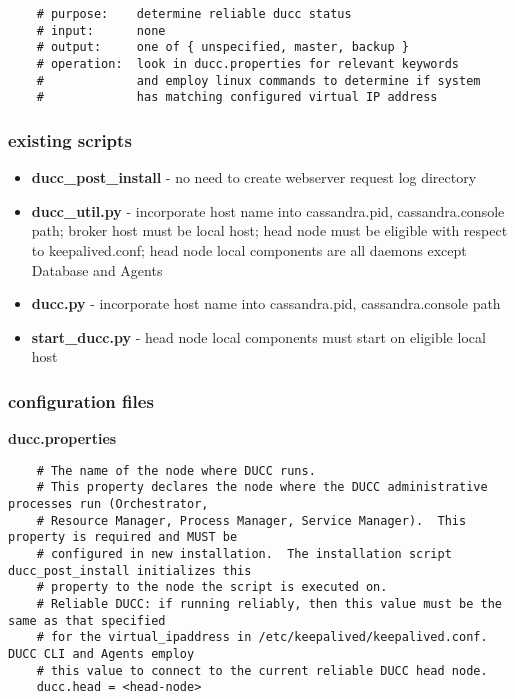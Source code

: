 \documentclass[letterpaper]{article}
\begin{document}
   \begin{verbatim}
    # purpose:    determine reliable ducc status
    # input:      none
    # output:     one of { unspecified, master, backup }
    # operation:  look in ducc.properties for relevant keywords
    #             and employ linux commands to determine if system
    #             has matching configured virtual IP address
   \end{verbatim}

\subsubsection{existing scripts}

{\renewcommand\labelitemi{}
\begin{itemize}
  \item \textbf{ducc\_post\_install} - no need to create webserver request log directory
  \item \textbf{ducc\_util.py} - incorporate host name into cassandra.pid, cassandra.console path; broker host must be local host; head node must be eligible with respect to keepalived.conf; head node local components are all daemons except Database and Agents
  \item \textbf{ducc.py} - incorporate host name into cassandra.pid, cassandra.console path
  \item \textbf{start\_ducc.py} - head node local components must start on eligible local host
\end{itemize}
}

\subsubsection{configuration files}

\textbf{ducc.properties}  

   \begin{verbatim}
    # The name of the node where DUCC runs.
    # This property declares the node where the DUCC administrative processes run (Orchestrator,
    # Resource Manager, Process Manager, Service Manager).  This property is required and MUST be
    # configured in new installation.  The installation script ducc_post_install initializes this 
    # property to the node the script is executed on.
    # Reliable DUCC: if running reliably, then this value must be the same as that specified
    # for the virtual_ipaddress in /etc/keepalived/keepalived.conf.  DUCC CLI and Agents employ
    # this value to connect to the current reliable DUCC head node.
    ducc.head = <head-node>
   \end{verbatim}
\end{document}
